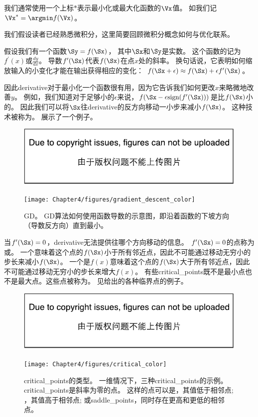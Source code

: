 我们通常使用一个上标$*$表示最小化或最大化函数的$\Vx$值。
如我们记$\Vx^*=\argmin f(\Vx)$。

我们假设读者已经熟悉微积分，这里简要回顾微积分概念如何与优化联系。


假设我们有一个函数$\Sy = f(\Sx)$， 其中$\Sx$和$\Sy$是实数。
这个函数的记为$f^\prime(x)$或$\frac{dy}{dx}$。
导数$f^\prime(\Sx)$代表$f(\Sx)$在点$x$处的斜率。
换句话说，它表明如何缩放输入的小变化才能在输出获得相应的变化：
$f(\Sx+\epsilon) \approx f(\Sx) + \epsilon f^\prime(\Sx) $。

因此\gls{derivative}对于最小化一个函数很有用，因为它告诉我们如何更改$x$来略微地改善$y$。
例如，我们知道对于足够小的$\epsilon$来说，$f(\Sx-\epsilon \text{sign}(f^\prime(\Sx)) )$是比$f(\Sx)$小的。
因此我们可以将$\Sx$往\gls{derivative}的反方向移动一小步来减小$f(\Sx)$。
这种技术被称为\citep{cauchy1847}。
展示了一个例子。
\begin{figure}[!htb]
\ifOpenSource
\centerline{\includegraphics{figure.pdf}}
\else
\centerline{\texttt{[image: Chapter4/figures/gradient\_descent\_color]}}
\fi
\caption{\gls{GD}。 
\gls{GD}算法如何使用函数导数的示意图，即沿着函数的下坡方向（导数反方向）直到最小。}
\label{fig:chap4_gradient_descent_color}
\end{figure}


当$f^\prime(\Sx)=0$，\gls{derivative}无法提供往哪个方向移动的信息。
$ f^\prime(\Sx)=0 $的点称为或。
一个意味着这个点的$f(\Sx)$小于所有邻近点，因此不可能通过移动无穷小的步长来减小$f(\Sx)$。
一个是$f(x)$意味着这个点的$f(\Sx)$大于所有邻近点，因此不可能通过移动无穷小的步长来增大$f(x)$。
有些\gls{critical_points}既不是最小点也不是最大点。这些点被称为。
见给出的各种临界点的例子。
\begin{figure}[!htb]
\ifOpenSource
\centerline{\includegraphics{figure.pdf}}
\else
\centerline{\texttt{[image: Chapter4/figures/critical\_color]}}
\fi
\caption{\gls{critical_points}的类型。 
一维情况下，三种\gls{critical_points}的示例。
\gls{critical_points}是斜率为零的点。
这样的点可以是，其值低于相邻点; ，其值高于相邻点; 或\gls{saddle_points}，同时存在更高和更低的相邻点。
}
\label{fig:chap4_critical_color}
\end{figure}

